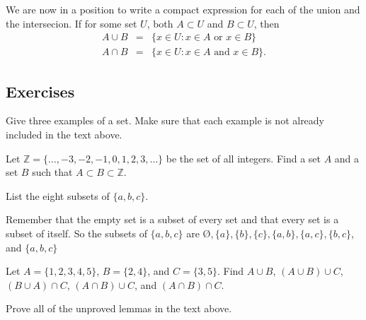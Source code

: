 We are now in a position to write a compact expression for each of the union
and the intersecion. If for some set $U$, both $A \subset U$ and $B \subset U$,
then
\begin{eqnarray}
   A \cup B &=& \{x \in U: \text{$x \in A$ or $x \in B$}\}\\
   A \cap B &=& \{x \in U: \text{$x \in A$ and $x \in B$}\}.
\end{eqnarray}

\subsection{Exercises}

\begin{exercise}
   Give three examples of a set. Make sure that each example is not already
   included in the text above.
\end{exercise}
\begin{exercise}
   Let $\mathbb{Z} = \{\ldots, -3, -2, -1, 0, 1, 2, 3, \ldots\}$ be the set of
   all integers. Find a set $A$ and a set $B$ such that $A \subset B \subset
   \mathbb{Z}$.
\end{exercise}
\begin{exercise}
   List the eight subsets of $\{a, b, c\}$.
   \begin{solution}
      Remember that the empty set is a subset of every set and that every set
      is a subset of itself. So the subsets of $\{a,b,c\}$ are $\text{\O},
      \{a\}, \{b\}, \{c\}, \{a, b\}, \{a, c\}, \{b, c\}$, and $\{a, b, c\}$
   \end{solution}
\end{exercise}
\begin{exercise}
   Let $A = \{1, 2, 3, 4, 5\}$, $B = \{2,4\}$, and $C = \{3,5\}$. Find $A \cup
   B$, $(A \cup B) \cup C$, $(B \cup A) \cap C$, $(A \cap B) \cup C$, and $(A
   \cap B) \cap C$.
\end{exercise}
\begin{exercise}
   Prove all of the unproved lemmas in the text above.
\end{exercise}
